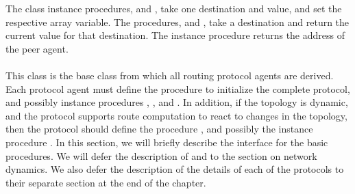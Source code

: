 The class instance procedures,
 and
,
take one destination and value, and set the respective array variable.
The procedures,
 and
,
take a destination and return the current value for that destination.
The instance procedure
returns the address of the peer agent.

\paragraph{\protect{}}
This class is the base class from
which all routing protocol agents are derived.
Each protocol agent must define the procedure
to initialize the complete protocol,
and possibly instance procedures , , and
.
In addition, if the topology is dynamic, and the protocol supports 
route computation to react to changes in the topology,
then the protocol should define the procedure , and
possibly the instance procedure .
In this section, we will briefly describe the interface for the basic
procedures.
We will defer the description of  and
to the section on network dynamics.
We also defer the description of the details of each of the protocols
to their separate section at the end of the chapter.
